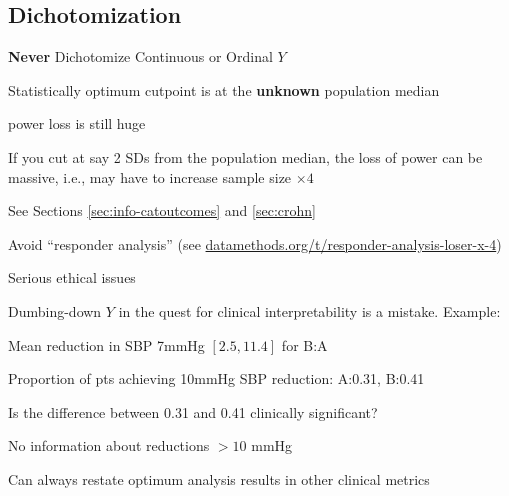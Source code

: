 \subsection{Dichotomization}\label{sec:overview-dichotomization}
\textbf{Never} Dichotomize Continuous or Ordinal $Y$
  \bi
  \item Statistically optimum cutpoint is at the \textbf{unknown}
    population median  
    \bi
    \item power loss is still huge
    \ei
  \item If you cut at say 2 SDs from the population median, the loss
    of power can be massive, i.e., may have to increase sample size
    $\times 4$
  \item See Sections \ref{sec:info-catoutcomes} and \ref{sec:crohn}
  \item Avoid ``responder analysis'' (see \href{http://datamethods.org/t/responder-analysis-loser-x-4}{datamethods.org/t/responder-analysis-loser-x-4})
  \item Serious ethical issues
  \item Dumbing-down $Y$ in the quest for clinical interpretability is
    a mistake.  Example:
    \bi
    \item Mean reduction in SBP 7mmHg $[2.5, 11.4]$ for B:A
    \item Proportion of pts achieving 10mmHg SBP reduction: A:0.31, B:0.41
      \bi
      \item Is the difference between 0.31 and 0.41 clinically significant?
      \item No information about reductions $> 10$ mmHg
      \ei
    \ei
  \item Can always restate optimum analysis results in other clinical metrics
  \ei
  
